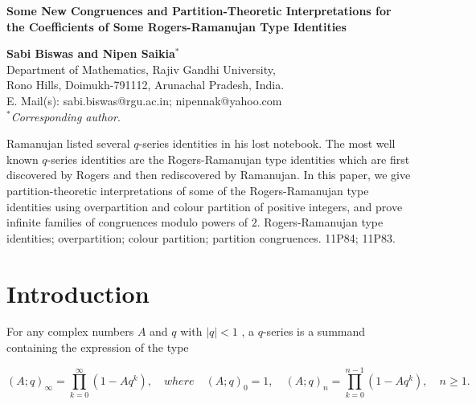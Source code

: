 \documentclass[12pt]{article}
\renewcommand{\(}{\left\(}
\renewcommand{\)}{\right\)}
\renewcommand{\[}{\left[}
\renewcommand{\]}{\right]}
\numberwithin{equation}{section}
\theoremstyle{plain}
\begin{document}
\begin{center}{\bf Some New Congruences and Partition-Theoretic Interpretations for the Coefficients of Some Rogers-Ramanujan Type Identities
	}\end{center}
	\begin{center}	
	\footnotesize{\bf Sabi Biswas and Nipen Saikia$^{\ast}$}\\
					Department of Mathematics, Rajiv Gandhi
			University,\\ Rono Hills, Doimukh-791112, Arunachal Pradesh, India.\\
			E. Mail(s): sabi.biswas@rgu.ac.in; nipennak@yahoo.com\\
			$^\ast$\textit{Corresponding author}.\end{center}\vskip2mm
		
		 Ramanujan listed several $q$-series identities in his lost notebook. The most well known $q$-series identities are the Rogers-Ramanujan type identities which are first discovered by Rogers and then rediscovered by Ramanujan. In this paper, we give partition-theoretic interpretations of some of the Rogers-Ramanujan type identities using overpartition and colour partition  of positive integers, and  prove infinite families of congruences modulo powers of $2$.
		\vskip 3mm
			 Rogers-Ramanujan type identities;  overpartition; colour partition; partition congruences. 
				\vskip 3mm
				 11P84; 11P83.
		
		\section{Introduction}
		For any complex numbers $A$ and $q$ with $|q|<1$ , a $q$-series is a summand containing the expression of the type
		
		$$(A;q)_{\infty} = \prod_{k=0}^{\infty}(1-Aq^k),\quad where\quad  (A;q)_{0} = 1,\quad (A;q)_{n} =\prod_{k=0}^{n-1}(1-Aq^k), \quad  n\ge1.$$
		
\end{document}
